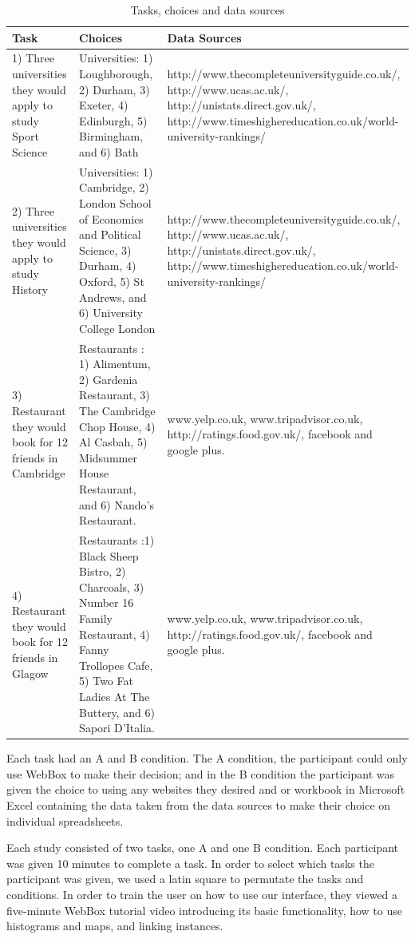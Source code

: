 \documentclass{sigchi}
\begin{document}
\begin{table}[t]
\begin{center}
\small
\begin{tabular}{|p{4cm}|p{6cm}|p{6cm}|}
\hline
Task	 &Choices	&Data Sources\\
\hline
1) Three universities they would apply to study Sport Science & Universities: 1) Loughborough,  2) Durham,  3) Exeter, 4) Edinburgh, 5) Birmingham, and 6) Bath & http://www.thecompleteuniversityguide.co.uk/, http://www.ucas.ac.uk/, http://unistats.direct.gov.uk/, http://www.timeshighereducation.co.uk/world-university-rankings/ \\
\hline
2) Three universities they would apply to study History & Universities: 1) Cambridge, 2) London School of Economics and Political Science, 3) Durham, 4) Oxford, 5) St Andrews, and 6) University College London & http://www.thecompleteuniversityguide.co.uk/, http://www.ucas.ac.uk/, http://unistats.direct.gov.uk/, http://www.timeshighereducation.co.uk/world-university-rankings/ \\
\hline
3) Restaurant they would book for 12 friends in Cambridge&Restaurants : 1) Alimentum, 2) Gardenia Restaurant, 3) The Cambridge Chop House, 4) Al Casbah, 5) Midsummer House Restaurant, and 6) Nando's Restaurant. & www.yelp.co.uk, www.tripadvisor.co.uk, http://ratings.food.gov.uk/, facebook and google plus.\\
\hline
4) Restaurant they would book for 12 friends in Glagow & Restaurants :1) Black Sheep Bistro, 2) Charcoals, 3) Number 16 Family Restaurant, 4) Fanny Trollopes Cafe, 5) Two Fat Ladies At The Buttery, and 6) Sapori D'Italia. & www.yelp.co.uk, www.tripadvisor.co.uk, http://ratings.food.gov.uk/, facebook and google plus.\\
\hline
\end{tabular}
\end{center}
\caption{Tasks, choices and data sources} \label{tab:studyfactors}
\normalsize
\end{table}%

Each task had an A and B condition.  The A condition, the participant could only use WebBox to make their decision; and in the B condition the participant was given the choice to using any websites they desired and or workbook in Microsoft Excel containing the data taken from the data sources to make their choice on individual spreadsheets.

Each study consisted of two tasks, one A and one B condition.  Each participant was given 10 minutes to complete a task.  In order to select which tasks the participant was given, we used a latin square to permutate the tasks and conditions.  In order to train the user on how to use our interface, they viewed a five-minute WebBox tutorial video introducing its basic functionality, how to use histograms and maps, and linking instances.
\end{document}

